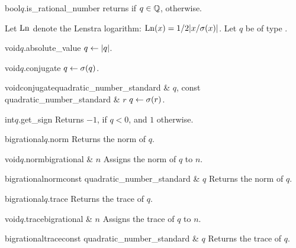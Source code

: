 \begin{cfcode}{bool}{$q$.is_rational_number}{}
  returns \TRUE if $q \in \mathbb{Q}$, \FALSE otherwise.
\end{cfcode}



\BASIC

Let $\operatorname{Ln}$ denote the Lenstra logarithm: $\operatorname{Ln}(x) = 1/2 |x / \sigma(x)|$.  Let $q$ be of type
.

\begin{fcode}{void}{$q$.absolute_value}{}
  $q \leftarrow |q|$.
\end{fcode}

\begin{fcode}{void}{$q$.conjugate}{}
  $q \leftarrow \sigma(q)$.
\end{fcode}

\begin{fcode}{void}{conjugate}{quadratic_number_standard & $q$, const quadratic_number_standard & $r$}
  $q \leftarrow \sigma(r)$.
\end{fcode}

\begin{cfcode}{int}{$q$.get_sign}{}
  Returns $-1$, if $q < 0$, and $1$ otherwise.
\end{cfcode}

\begin{cfcode}{bigrational}{$q$.norm}{}
  Returns the norm of $q$.
\end{cfcode}

\begin{cfcode}{void}{$q$.norm}{bigrational & $n$}
  Assigns the norm of $q$ to $n$.
\end{cfcode}

\begin{fcode}{bigrational}{norm}{const quadratic_number_standard & $q$}
  Returns the norm of $q$.
\end{fcode}

\begin{cfcode}{bigrational}{$q$.trace}{}
  Returns the trace of $q$.
\end{cfcode}

\begin{cfcode}{void}{$q$.trace}{bigrational & $n$}
  Assigns the trace of $q$ to $n$.
\end{cfcode}

\begin{fcode}{bigrational}{trace}{const quadratic_number_standard & $q$}
  Returns the trace of $q$.
\end{fcode}


